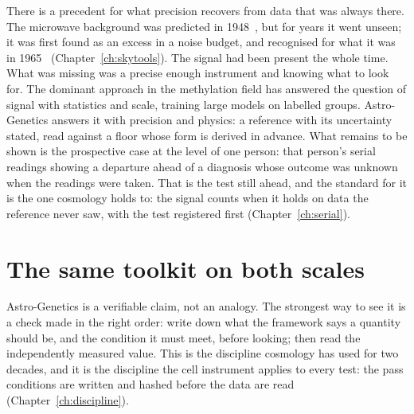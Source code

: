 There is a precedent for what precision recovers from data that was always there. The microwave background was predicted in
1948~\cite{AlpherHerman1948}, but for years it went unseen; it was first found as an excess in a noise budget, and recognised for what it
was in 1965~\cite{PenziasWilson1965,Dicke1965} (Chapter~\ref{ch:skytools}). \observed{} The signal had been present the whole time. What
was missing was a precise enough instrument and knowing what to look for. The dominant approach in the methylation field has answered the
question of signal with statistics and scale, training large models on labelled groups. Astro-Genetics answers it with precision and
physics: a reference with its uncertainty stated, read against a floor whose form is derived in advance. What remains to be shown is the
prospective case at the level of one person: that person's serial readings showing a departure ahead of a diagnosis whose outcome was
unknown when the readings were taken. That is the test still ahead, and the standard for it is the one cosmology holds to: the signal
counts when it holds on data the reference never saw, with the test registered first (Chapter~\ref{ch:serial}). \openprob

\section{The same toolkit on both scales}\label{sec:ag_both}

Astro-Genetics is a verifiable claim, not an analogy. The strongest way to see it is a check made in the right order: write down what the
framework says a quantity should be, and the condition it must meet, before looking; then read the independently measured value. This is
the discipline cosmology has used for two decades, and it is the discipline the cell instrument applies to every test: the pass conditions
are written and hashed before the data are read (Chapter~\ref{ch:discipline}).

